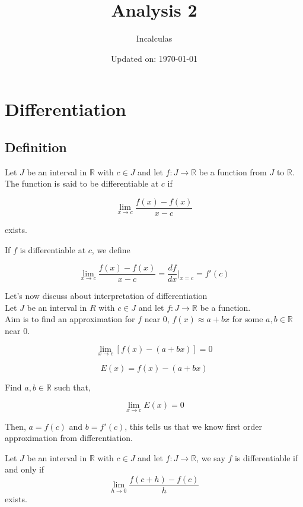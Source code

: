 \documentclass[11pt,a4paper]{colorart}
\title{\huge Analysis 2}
\author{Incalculas}
\date{Updated on: \today}
\def\l{\left}
\def\r{\right}
\def\R{\mathbb{R}}
\def\ra{\rightarrow}
\begin{document}
\maketitle
\tableofcontents
\newpage

\section{Differentiation}

\subsection{Definition}

\begin{definition}[Differentiation]
	Let $J$ be an interval in $\R$ with $c\in J$ and let $f:J\ra \R$ be a function from $J$ to $\R$.
	The function is said to be differentiable at $c$ if 
	
	\[ \lim_{ x \to c } \frac{ f(x) - f(x) }{ x - c } \]
	
	exists.

\end{definition}

\begin{notation}[Differentiation]
	If $f$ is differentiable at $c$, we define 
	
	\[ \lim_{ x \to c } \frac{ f(x) - f(x) }{ x - c } 
	   = \frac{ df }{ dx } \biggr|_{ x=c } = f'(c) \]
\end{notation}

Let's now discuss about interpretation of differentiation\\

Let $J$ be an interval in $R$ with $c\in J$ and let $f:J\ra \R$ be a function.\\

Aim is to find an approximation for $f$ near 0, $f(x) \approx a + bx$ for some $a,b \in \R$ near 0.

\[ \lim_{x \to c} \l[ f(x) - (a+bx) \r] = 0 \]

\[ E(x) = f(x) - (a+bx) \]

Find $a,b \in \R$ such that,

\[ \lim_{x \to c} E(x) = 0 \]

Then, $a=f(c)$ and $b=f'(c)$, this tells us  that we know first order approximation from differentiation. 

\begin{definition}
	Let $J$ be an interval in $\R$ with $c \in J$ and let $f:J \ra \R$, we say $f$ is differentiable if and only if 
	\[ \lim_{h \to 0} \frac{ f(c+h) - f(c) }{ h } \]
	exists.
\end{definition}
\end{document}
